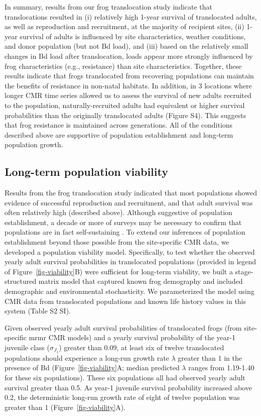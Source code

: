 \documentclass[9pt,twocolumn,twoside,lineno]{pnas-new}
\begin{document}
In summary, results from our frog translocation study indicate that
translocations resulted in (i) relatively high 1-year survival of
translocated adults, as well as reproduction and recruitment, at the
majority of recipient sites, (ii) 1-year survival of adults is
influenced by site characteristics, weather conditions, and donor
population (but not Bd load), and (iii) based on the relatively small
changes in Bd load after translocation, loads appear more strongly
influenced by frog characteristics (e.g., resistance) than site
characteristics. Together, these results indicate that frogs
translocated from recovering populations can maintain the benefits of
resistance in non-natal habitats. In addition, in 3 locations where
longer CMR time series allowed us to assess the survival of new adults
recruited to the population, naturally-recruited adults had equivalent
or higher survival probabilities than the originally translocated adults
(Figure S4). This suggests that frog
resistance is maintained across generations. All of the conditions
described above are supportive of population establishment and long-term
population growth.

\subsection*{Long-term population viability}

Results from the frog translocation study indicated that most
populations showed evidence of successful reproduction and recruitment,
and that adult survival was often relatively high (described above).
Although suggestive of population establishment, a decade or more of
surveys may be necessary to confirm that populations are in fact
self-sustaining \citep{joseph2018}. To extend our inferences of
population establishment beyond those possible from the site-specific
CMR data, we developed a population viability model. Specifically, to
test whether the observed yearly adult survival probabilities in
translocated populations (provided in legend of
Figure~\ref{fig-viability}B) were sufficient for long-term viability,
we built a stage-structured matrix model that captured known frog
demography and included demographic and environmental stochasticity. We
parameterized the model using CMR data from translocated populations and
known life history values in this system (Table S2
SI).

Given observed yearly adult survival probabilities of translocated frogs
(from site-specific mrmr CMR models) and a yearly survival probability
of the year-1 juvenile class (\(\sigma_{J_1}\)) greater than 0.09, at
least six of twelve translocated populations should experience a
long-run growth rate \(\lambda\) greater than 1 in the presence of Bd
(Figure~\ref{fig-viability}A; median predicted \(\lambda\) ranges from
1.19-1.40 for these six populations). These six populations all had
observed yearly adult survival greater than 0.5. As year-1 juvenile
survival probability increased above 0.2, the deterministic long-run
growth rate of eight of twelve population was greater than 1
(Figure~\ref{fig-viability}A).
\end{document}
